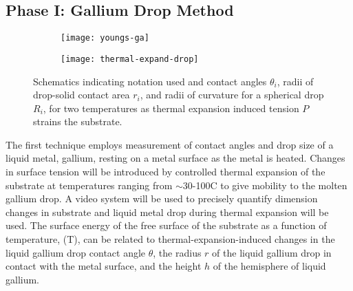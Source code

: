 
\subsection{Phase I: Gallium Drop Method}


\begin{wrapfigure}[12]{r}{0.5\linewidth}
	\begin{subfigure}[b]{0.5\textwidth}
		\texttt{[image: youngs-ga]}
		\label{fig:youngs-ga}
	\end{subfigure}
	\begin{subfigure}[b]{0.5\textwidth}
		\texttt{[image: thermal-expand-drop]}
		\label{fig:thermal-expand-drop}
	\end{subfigure}
	\caption{Schematics indicating notation used and contact angles $\theta_{i}$, radii of drop-solid contact area $r_{i}$, and radii of curvature for a spherical drop $R_{i}$, for two temperatures as thermal expansion induced tension $P$ strains the substrate.}
	\label{fig:therm-exp-ga}
\end{wrapfigure}
The first technique employs measurement of contact angles and drop size of a liquid metal, gallium, resting on a metal surface as the metal is heated. Changes in surface tension will be introduced by controlled thermal expansion of the substrate at temperatures ranging from $\sim$30-100\degree C to give mobility to the molten gallium drop.
A video system will be used to precisely quantify dimension changes in substrate and liquid metal drop during thermal expansion will be used. The surface energy of the free surface of the substrate as a function of temperature, \gamSV(T), can be related to thermal-expansion-induced changes in the liquid gallium drop contact angle $\theta$, the radius $r$ of the liquid gallium drop in contact with the metal surface, and the height $h$ of the hemisphere of liquid gallium. 

